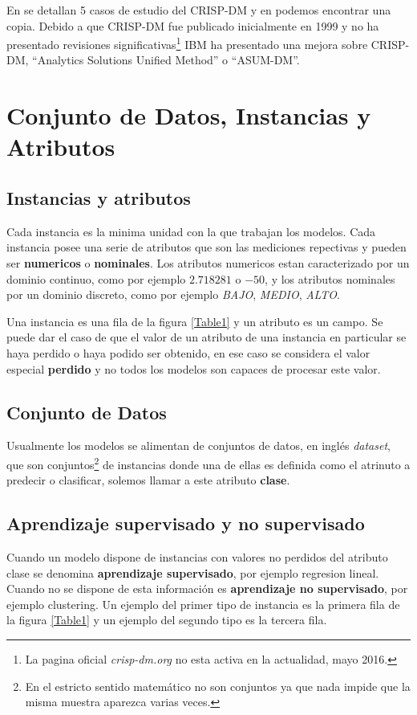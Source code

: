 \documentclass[10pt,a4paper]{article}
\begin{document}
En \cite{larose2014discovering} se detallan 5 casos de estudio del CRISP-DM y en \cite{crispdmpdf} podemos encontrar una copia. Debido a que CRISP-DM fue publicado inicialmente en 1999 y no ha presentado revisiones significativas\footnote{La pagina oficial \textit{crisp-dm.org} no esta activa en la actualidad, mayo 2016.} IBM ha presentado una mejora sobre CRISP-DM, ``Analytics Solutions Unified Method'' o ``ASUM-DM''\cite{asumdmarticle}.

\section{Conjunto de Datos, Instancias y Atributos}
\subsection{Instancias y atributos}
Cada instancia es la minima unidad con la que trabajan los modelos. Cada instancia posee una serie de atributos que son las mediciones repectivas y pueden ser \textbf{numericos} o \textbf{nominales}. Los atributos numericos estan caracterizado por un dominio continuo, como por ejemplo $2.718281$ o $-50$, y los atributos nominales por un dominio discreto, como por ejemplo \textit{BAJO}, \textit{MEDIO}, \textit{ALTO}.

Una instancia es una fila de la figura \ref{Table1} y un atributo es un campo. Se puede dar el caso de que el valor de un atributo de una instancia en particular se haya perdido o haya podido ser obtenido, en ese caso se considera el valor especial \textbf{perdido} y no todos los modelos son capaces de procesar este valor.

\subsection{Conjunto de Datos}
Usualmente los modelos se alimentan de conjuntos de datos, en inglés \textit{dataset}, que son conjuntos\footnote{En el estricto sentido matemático no son conjuntos ya que nada impide que la misma muestra aparezca varias veces.} de instancias donde una de ellas es definida como el atrinuto a predecir o clasificar, solemos llamar a este atributo \textbf{clase}.

\subsection{Aprendizaje supervisado y no supervisado}
Cuando un modelo dispone de instancias con valores no perdidos del atributo clase se denomina \textbf{aprendizaje supervisado}, por ejemplo regresion lineal. Cuando no se dispone de esta información es \textbf{aprendizaje no supervisado}, por ejemplo clustering. Un ejemplo del primer tipo de instancia es la primera fila de la figura \ref{Table1} y un ejemplo del segundo tipo es la tercera fila.
\end{document}
